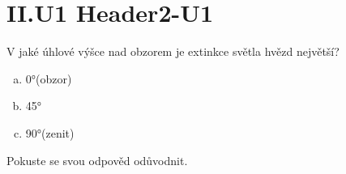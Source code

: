 \documentclass{../../../../style/mkimain}
\begin{document}
\section*{II.U1 Header2-U1}
\noindent
V jaké úhlové výšce nad obzorem je extinkce světla hvězd největší?  
\begin{enumerate}[a)]
    \setlength{\parindent}{20pt}
        \item \ang{0}(obzor)
        \item \ang{45}
        \item \ang{90}(zenit)
        \end{enumerate}  

Pokuste se svou odpověd odůvodnit.
\end{document}
